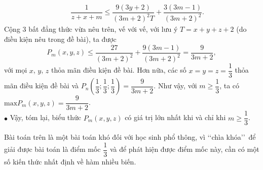 \begin{bt}
{{\begin{eqnarray*}
			& & \dfrac{1}{z+x+m} \leq \dfrac{9(3y+2)}{(3m+2)^2T}+\dfrac{3(3m-1)}{(3m+2)^2}.
		\end{eqnarray*}}Cộng $3$ bất đẳng thức vừa nêu trên, vế với vế, với lưu ý $T=x+y+z+2$ (do điều kiện nêu trong đề bài), ta được
		$$P_m(x,y,z) \leq \dfrac{27}{(3m+2)^2} + \dfrac{9(3m-1)}{(3m+2)^2} = \dfrac{9}{3m+2},$$ với mọi $x$, $y$, $z$ thỏa mãn điều kiện đề bài. 
		Hơn nữa, các số $x=y=z=\dfrac{1}{3}$ thỏa mãn điều kiện đề bài và $P_n\left(\dfrac{1}{3}; \dfrac{1}{3}; \dfrac{1}{3}\right) = \dfrac{9}{3m+2}$. 
		Như vậy, với $m \geq \dfrac{1}{3}$, ta có $\mathrm{max}P_m(x,y,z) =\dfrac{9}{3m+2}$.\\
		$\bullet$ Vậy, tóm lại, biểu thức $P_m(x,y,z)$ có giá trị lớn nhất khi và chỉ khi $m \geq \dfrac{1}{3}$.
		\begin{nx}
		Bài toán trên là một bài toán khó đối với học sinh phổ thông, vì  \lq \lq chìa khóa\rq \rq \, để giải được bài toán là điểm mốc $\dfrac{1}{3}$ và để phát hiện được điểm mốc này, cần có một số kiến thức nhất định về hàm nhiều biến.
	\end{nx}
	}
	
\end{bt}
